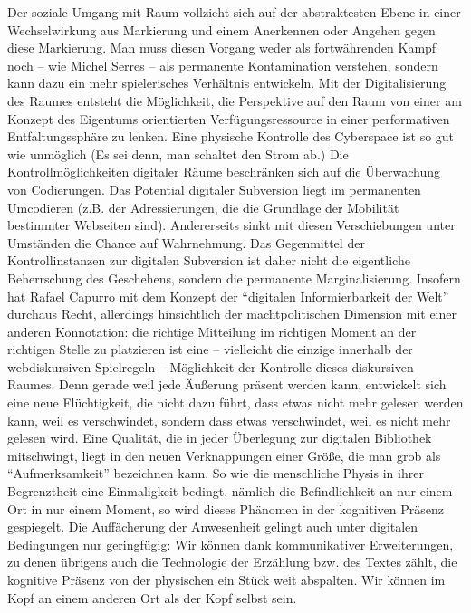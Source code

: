 \documentclass[output=paper]{langscibook}
\begin{document}
Der soziale Umgang mit Raum vollzieht sich auf der abstraktesten Ebene
in einer Wechselwirkung aus Markierung und einem Anerkennen oder Angehen
gegen diese Markierung. Man muss diesen Vorgang weder als fortwährenden
Kampf noch -- wie Michel Serres -- als permanente Kontamination
verstehen, sondern kann dazu ein mehr spielerisches Verhältnis
entwickeln. Mit der Digitalisierung des Raumes entsteht die Möglichkeit,
die Perspektive auf den Raum von einer am Konzept des Eigentums
orientierten Verfügungsressource in einer performativen
Entfaltungssphäre zu lenken. Eine physische Kontrolle des Cyberspace ist
so gut wie unmöglich (Es sei denn, man schaltet den Strom ab.) Die
Kontrollmöglichkeiten digitaler Räume beschränken sich auf die
Überwachung von Codierungen. Das Potential digitaler Subversion liegt im
permanenten Umcodieren (z.B. der Adressierungen, die die Grundlage der
Mobilität bestimmter Webseiten sind). Andererseits sinkt mit diesen
Verschiebungen unter Umständen die Chance auf Wahrnehmung. Das
Gegenmittel der Kontrollinstanzen zur digitalen Subversion ist daher
nicht die eigentliche Beherrschung des Geschehens, sondern die
permanente Marginalisierung. Insofern hat Rafael Capurro mit dem Konzept
der \enquote{digitalen Informierbarkeit der Welt} durchaus Recht,
allerdings hinsichtlich der machtpolitischen Dimension mit einer anderen
Konnotation: die richtige Mitteilung im richtigen Moment an der
richtigen Stelle zu platzieren ist eine -- vielleicht die einzige
innerhalb der webdiskursiven Spielregeln -- Möglichkeit der Kontrolle
dieses diskursiven Raumes. Denn gerade weil jede Äußerung präsent werden
kann, entwickelt sich eine neue Flüchtigkeit, die nicht dazu führt, dass
etwas nicht mehr gelesen werden kann, weil es verschwindet, sondern dass
etwas verschwindet, weil es nicht mehr gelesen wird. Eine Qualität, die
in jeder Überlegung zur digitalen Bibliothek mitschwingt, liegt in den
neuen Verknappungen einer Größe, die man grob als
\enquote{Aufmerksamkeit} bezeichnen kann. So wie die menschliche Physis
in ihrer Begrenztheit eine Einmaligkeit bedingt, nämlich die
Befindlichkeit an nur einem Ort in nur einem Moment, so wird dieses
Phänomen in der kognitiven Präsenz gespiegelt. Die Auffächerung der
Anwesenheit gelingt auch unter digitalen Bedingungen nur geringfügig:
Wir können dank kommunikativer Erweiterungen, zu denen übrigens auch die
Technologie der Erzählung bzw. des Textes zählt, die kognitive Präsenz
von der physischen ein Stück weit abspalten. Wir können im Kopf an einem
anderen Ort als der Kopf selbst sein.
\end{document}
